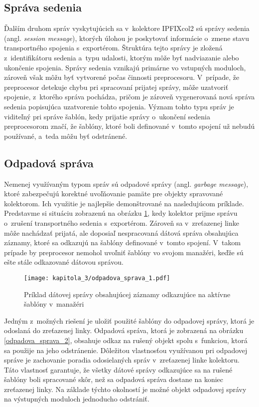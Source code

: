 \subsection*{Správa sedenia}
Ďalším druhom správ vyskytujúcich sa v~kolektore IPFIXcol2 sú správy sedenia (angl. \textit{session message}), ktorých úlohou je poskytovať informácie o~zmene stavu transportného spojenia s~exportérom. Štruktúra tejto správy je zložená z~identifikátoru sedenia a~typu udalosti,
ktorým môže byť nadviazanie alebo ukončenie spojenia. Správy sedenia vznikajú primárne vo vstupných moduloch, zároveň však môžu byť vytvorené počas činnosti preprocesoru. V~prípade, že preprocesor detekuje chybu pri spracovaní prijatej správy, môže uzatvoriť spojenie, z~ktorého správa pochádza,
pričom je zároveň vygenerovaná nová správa sedenia popisujúca uzatvorenie tohto spojenia. Význam tohto typu správ je viditeľný pri správe šablón, kedy prijatie správy o~ukončení sedenia preprocesorom značí, že šablóny, ktoré boli definované v~tomto spojení už nebudú používané,
a~teda môžu byť odstránené.

\subsection*{Odpadová správa}

Nemenej využívaným typom správ sú odpadové správy (angl. \textit{garbage message}), ktoré zabezpečujú korektné uvoľňovanie pamäte pre objekty spravované kolektorom. Ich využitie je najlepšie demonštrované na nasledujúcom príklade. Predstavme si situáciu zobrazenú na obrázku
\ref{odpadova_sprava_1}, kedy kolektor prijme správu o~zrušení transportného sedenia s~exportérom. Zároveň sa v~zreťazenej linke môže nachádzať prijatá, ale doposiaľ nespracovaná dátová správa obsahujúca záznamy, ktoré sa odkazujú na šablóny definované v~tomto spojení.
V~takom prípade by preprocesor nemohol uvoľniť šablóny vo svojom manažéri, keďže sú ešte stále odkazované dátovou správou.

\begin{figure}[ht]
    \texttt{[image: kapitola\_3/odpadova\_sprava\_1.pdf]}
    \caption{Príklad dátovej správy obsahujúcej záznamy odkazujúce na aktívne šablóny v~manažéri}
    \label{odpadova_sprava_1}
\end{figure}

Jedným z~možných riešení je uložiť použité šablóny do odpadovej správy, ktorá je odoslaná do zreťazenej linky. Odpadová správa, ktorá je zobrazená na obrázku \ref{odpadova_sprava_2}, obsahuje odkaz na rušený objekt spolu s~funkciou, ktorá sa použije na jeho odstránenie.
Dôležitou vlastnosťou využívanou pri odpadovej správe je zachovanie poradia odosielaných správ v~zreťazenej linke kolektoru. Táto vlastnosť garantuje, že všetky dátové správy odkazujúce sa na rušené šablóny boli spracované skôr, než sa odpadová správa dostane na koniec zreťazenej linky.
Na základe týchto okolností je možné objekt odpadovej správy na výstupných moduloch jednoducho odstrániť.

